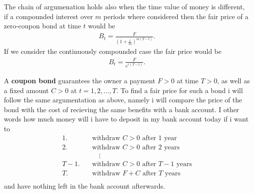 \documentclass{article}
\theoremstyle{definition}
\numberwithin{equation}{section}
\begin{document}
The chain of argumenation holds also when the time value of money is different, if a compounded interest over $m$ periods where considered then the fair price of a zero-coupon bond at time $t$ would be
\begin{align}
    B_t = \frac{F}{\left(1 + \frac{r}{m}\right)^{m(T - t)}}.
\end{align}
If we consider the continuously compounded case the fair price would be
\begin{align}
    B_t = \frac{F}{e^{r(T -t)}}.
\end{align}

A \textbf{coupon bond} guarantees the owner a payment $F > 0$ at time $T > 0$, as well as a fixed amount $C > 0$ at $t = 1,2,\ldots,T$.
To find a fair price for such a bond i will follow the same argumentation as above, namely i will compare the price of the bond with the cost of recieving the same benefits with a bank account.
I other words how much money will i have to deposit in my bank account today if i want to
\begin{align*}
    \text{1.} \quad &\text{withdraw $C > 0$ after 1 year} \\
    \text{2.} \quad &\text{withdraw $C > 0$ after 2 years} \\
    &\quad \vdots \\
    \text{$T-1$.} \quad &\text{withdraw $C > 0$ after $T-1$ years} \\
    \text{$T$.} \quad &\text{withdraw $F + C$ after $T$ years} \\
\end{align*}
and have nothing left in the bank account afterwards.
\end{document}
